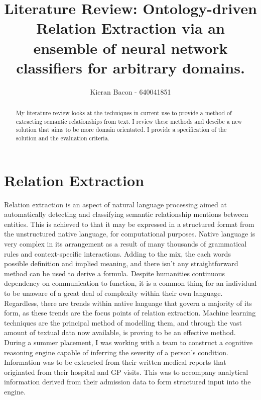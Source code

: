 \documentclass{ecmm427_assignment}
\begin{document}
\title{Literature Review: Ontology-driven Relation Extraction via an ensemble of neural network classifiers for arbitrary domains.}
\author{Kieran Bacon - 640041851}
\maketitle
\thispagestyle{empty}

\begin{abstract}
My literature review looks at the techniques in current use to provide a method of extracting semantic relationships from text. I review these methods and descibe a new solution that aims to be more domain orientated. I provide a specification of the solution and the evaluation criteria.
\end{abstract}

\declaration
\newpage %

\tableofcontents
\thispagestyle{empty}

\newpage
{}

\section{Relation Extraction}

Relation extraction is an aspect of natural language processing aimed at automatically detecting and classifying semantic relationship mentions between entities. This is achieved to that it may be expressed in a structured format from the unstructured native language, for computational purposes. Native language is very complex in its arrangement as a result of many thousands of grammatical rules and context-specific interactions. Adding to the mix, the each words possible definition and implied meaning, and there isn't any straightforward method can be used to derive a formula. Despite humanities continuous dependency on communication to function, it is a common thing for an individual to be unaware of a great deal of complexity within their own language. Regardless, there are trends within native language that govern a majority of its form, as these trends are the focus points of relation extraction. Machine learning techniques are the principal method of modelling them, and through the vast amount of textual data now available, is proving to be an effective method.\\

During a summer placement, I was working with a team to construct a cognitive reasoning engine capable of inferring the severity of a person's condition. Information was to be extracted from their written medical reports that originated from their hospital and GP visits. This was to accompany analytical information derived from their admission data to form structured input into the engine. 
\end{document}

